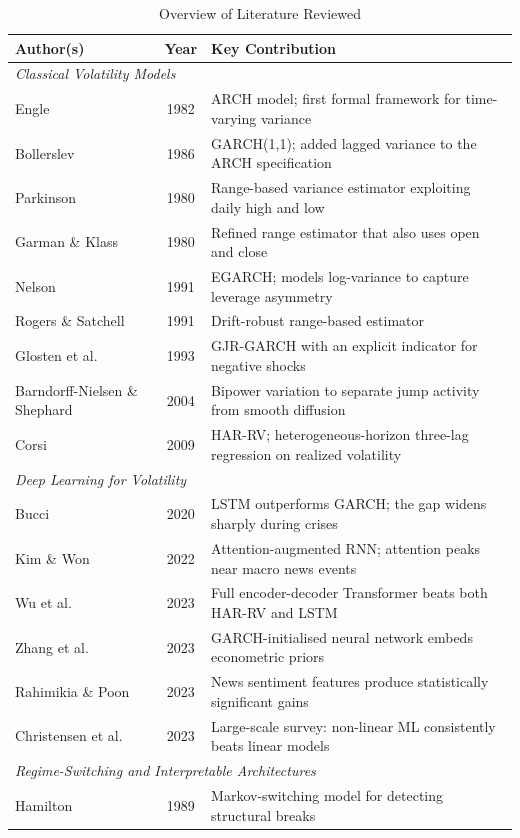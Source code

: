 \begin{table}[!t]
\caption{Overview of Literature Reviewed}
\label{tab:litoverview}
\centering
\scriptsize
\begin{tabular}{p{4.2cm}cp{7.2cm}}
\hline
\textbf{Author(s)} & \textbf{Year} & \textbf{Key Contribution} \\
\hline
\multicolumn{3}{l}{\emph{Classical Volatility Models}} \\
Engle & 1982 & ARCH model; first formal framework for time-varying variance \\
Bollerslev & 1986 & GARCH(1,1); added lagged variance to the ARCH specification \\
Parkinson & 1980 & Range-based variance estimator exploiting daily high and low \\
Garman \& Klass & 1980 & Refined range estimator that also uses open and close \\
Nelson & 1991 & EGARCH; models log-variance to capture leverage asymmetry \\
Rogers \& Satchell & 1991 & Drift-robust range-based estimator \\
Glosten et al. & 1993 & GJR-GARCH with an explicit indicator for negative shocks \\
Barndorff-Nielsen \& Shephard & 2004 & Bipower variation to separate jump activity from smooth diffusion \\
Corsi & 2009 & HAR-RV; heterogeneous-horizon three-lag regression on realized volatility \\
\hline
\multicolumn{3}{l}{\emph{Deep Learning for Volatility}} \\
Bucci & 2020 & LSTM outperforms GARCH; the gap widens sharply during crises \\
Kim \& Won & 2022 & Attention-augmented RNN; attention peaks near macro news events \\
Wu et al. & 2023 & Full encoder-decoder Transformer beats both HAR-RV and LSTM \\
Zhang et al. & 2023 & GARCH-initialised neural network embeds econometric priors \\
Rahimikia \& Poon & 2023 & News sentiment features produce statistically significant gains \\
Christensen et al. & 2023 & Large-scale survey: non-linear ML consistently beats linear models \\
\hline
\multicolumn{3}{l}{\emph{Regime-Switching and Interpretable Architectures}} \\
Hamilton & 1989 & Markov-switching model for detecting structural breaks \\

\end{tabular}
\end{table}
